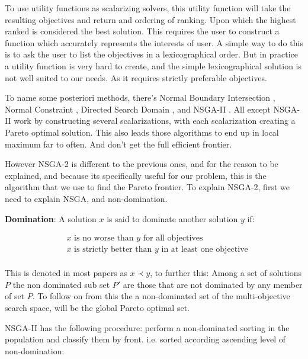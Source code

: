 \documentclass[11pt]{article}
\begin{document}
    To use utility functions as scalarizing solvers, this utility function will take
    the resulting objectives and return and ordering of ranking. Upon which the highest
    ranked is considered the best solution. This requires the user to construct
    a function which accurately represents the interests of user. A simple way
    to do this is to ask the user to list the objectives in a lexicographical order.
    But in practice a utility function is very hard to create, and the simple
    lexicographical solution is not well suited to our needs. As it requires
    strictly preferable objectives.

    To name some posteriori methods, there's Normal Boundary Intersection \cite{Indraneel},
    Normal Constraint \cite{Messac}, Directed Search Domain \cite{Tohid}, and NSGA-II
    \cite{DebPratapAgarwalMeyarivan}. All except NSGA-II work by constructing several
    scalarizations, with each scalarization creating a Pareto optimal solution.
    This also leads those algorithms to end up in local maximum far to often. And
    don't get the full efficient frontier.

    However NSGA-2 is different to the previous ones, and for the reason to be explained,
    and because its specifically useful for our problem, this is the algorithm that
    we use to find the Pareto frontier. To explain NSGA-2, first we need to explain
    NSGA, and non-domination.

    \textbf{Domination}: A solution \(x\) is said to dominate another solution \(y\) if:

    \begin{align*}
        & x \text{ is no worse than } y \text{ for all objectives} \\
        & x \text{ is strictly better than } y \text{ in at least one objective} \\
    \end{align*}

    This is denoted in most papers as \(x \prec y\), to further this: Among a set of solutions \(P\)
    the non dominated sub set \(P'\) are those that are not dominated by any member of
    set \(P\). To follow on from this the a non-dominated set of the multi-objective search
    space, will be the global Pareto optimal set.

    NSGA-II has the following procedure: perform a non-dominated sorting in the population
    and classify them by front. i.e. sorted according ascending level of non-domination.
\end{document}
